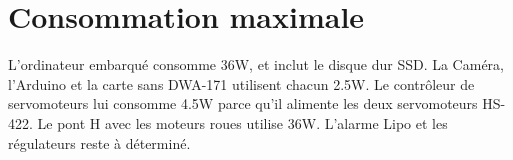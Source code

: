 \section{Consommation maximale}
L’ordinateur embarqué consomme 36W, et inclut le disque dur SSD. La Caméra, l’Arduino et la carte sans DWA-171 utilisent chacun 2.5W. Le contrôleur de servomoteurs lui consomme 4.5W parce qu’il alimente les deux servomoteurs HS-422. Le pont H avec les moteurs roues utilise 36W. L’alarme Lipo et les régulateurs reste à déterminé. 

